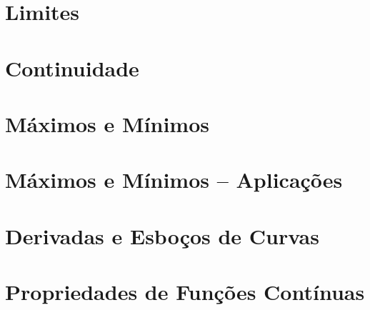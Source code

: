 \begin{sectionproblems}
\end{sectionproblems}

\section{Limites}
\label{sec:limits}

\section{Continuidade}
\label{sec:continuity}

\section{Máximos e Mínimos}
\label{sec:maxmin}

\section{Máximos e Mínimos -- Aplicações}
\label{sec:maxminappl}

\section{Derivadas e Esboços de Curvas}
\label{sec:derivsketch}

\section{Propriedades de Funções Contínuas}
\label{sec:propcont}

\begin{chapterproblems}
\end{chapterproblems}
